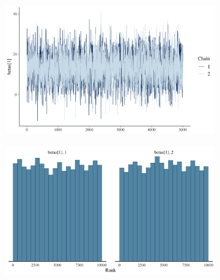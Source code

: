 \documentclass[12pt]{article}
\begin{document}
\begin{figure}[ht]
    \centering
    \begin{subfigure}[b]{0.45\textwidth}
        \centering
        \includegraphics[width=\linewidth]{figures/trace_normal_1.png}
        \label{fig:4a}
    \end{subfigure}
    \hfill
    \begin{subfigure}[b]{0.45\textwidth}
        \centering
        \includegraphics[width=\linewidth]{figures/rank_normal_1.png}
        \label{fig:4b}
    \end{subfigure}


\end{figure}
\end{document}
